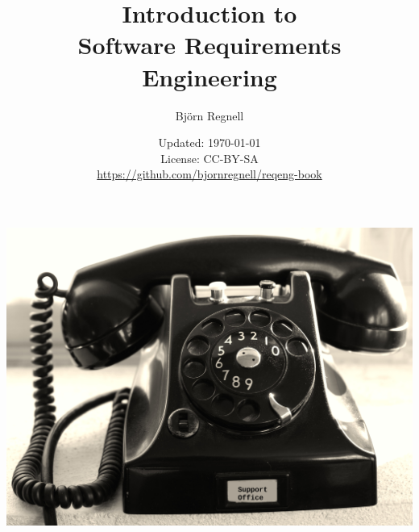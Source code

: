 \documentclass{reqengbook}
\title{
\bf\sffamily\fontsize{25}{30}\selectfont
Introduction to\\Software Requirements Engineering
}
\author{\sffamily\fontsize{20}{30}\selectfont Björn Regnell}
\date{\vspace{2em}\sffamily\small Updated: \today 
\\ License: CC-BY-SA 
\\ \url{https://github.com/bjornregnell/reqeng-book} 
}
\begin{document}

\begin{minipage}{0.5\textwidth}
  \maketitle%
\end{minipage}%
\begin{minipage}{0.5\textwidth}
  \centering\vspace{2.2cm}
  \includegraphics[width=1.0\textwidth]{../img/phone-support.jpg}%
\end{minipage}%
\pagebreak

\setcounter{tocdepth}{2}

\begin{multicols*}{2}  %
\footnotesize
\tableofcontents
\end{multicols*}



\end{document}
